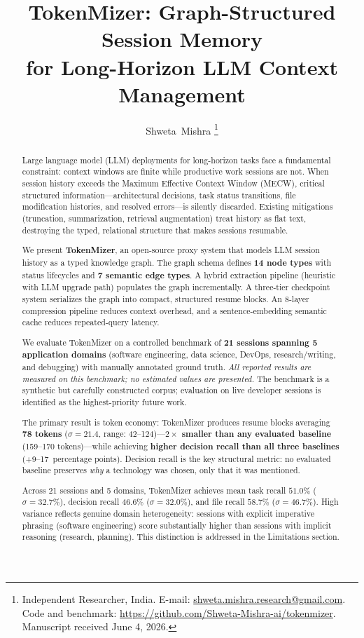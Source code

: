 \documentclass[journal]{IEEEtran}
\title{TokenMizer: Graph-Structured Session Memory\\
for Long-Horizon LLM Context Management}
\author{Shweta~Mishra%
\thanks{Independent Researcher, India.
E-mail: \href{mailto:shweta.mishra.research@gmail.com}{shweta.mishra.research@gmail.com}.
Code and benchmark: \url{https://github.com/Shweta-Mishra-ai/tokenmizer}.
Manuscript received June 4, 2026.}%
}
\begin{document}
\maketitle

\begin{abstract}
Large language model (LLM) deployments for long-horizon tasks
face a fundamental constraint: context windows are finite while
productive work sessions are not.
When session history exceeds the Maximum Effective Context
Window (MECW), critical structured information---architectural
decisions, task status transitions, file modification histories,
and resolved errors---is silently discarded.
Existing mitigations (truncation, summarization, retrieval
augmentation) treat history as flat text, destroying the
typed, relational structure that makes sessions resumable.

We present \textbf{TokenMizer}, an open-source proxy system
that models LLM session history as a typed knowledge graph.
The graph schema defines \textbf{14 node types} with status
lifecycles and \textbf{7 semantic edge types}.
A hybrid extraction pipeline (heuristic with LLM upgrade path)
populates the graph incrementally.
A three-tier checkpoint system serializes the graph into
compact, structured resume blocks.
An 8-layer compression pipeline reduces context overhead, and
a sentence-embedding semantic cache reduces repeated-query
latency.

We evaluate TokenMizer on a controlled benchmark of
\textbf{21 sessions spanning 5 application domains} (software
engineering, data science, DevOps, research/writing, and
debugging) with manually annotated ground truth.
\textit{All reported results are measured on this benchmark;
no estimated values are presented.}
The benchmark is a synthetic but carefully constructed
corpus; evaluation on live developer sessions is identified
as the highest-priority future work.

The primary result is token economy: TokenMizer produces
resume blocks averaging \textbf{78 tokens}
($\sigma\!=\!21.4$, range: 42--124)---\textbf{$2\times$
smaller than any evaluated baseline} (159--170 tokens)---while
achieving \textbf{higher decision recall than all three
baselines} (+9--17~percentage points).
Decision recall is the key structural metric: no evaluated
baseline preserves \emph{why} a technology was chosen,
only that it was mentioned.

Across 21 sessions and 5 domains, TokenMizer achieves mean
task recall $51.0\%$ ($\sigma\!=\!32.7\%$), decision recall
$46.6\%$ ($\sigma\!=\!32.0\%$), and file recall $58.7\%$
($\sigma\!=\!46.7\%$).
High variance reflects genuine domain heterogeneity: sessions
with explicit imperative phrasing (software engineering) score
substantially higher than sessions with implicit reasoning
(research, planning).
This distinction is addressed in the Limitations section.


\end{abstract}
\end{document}
